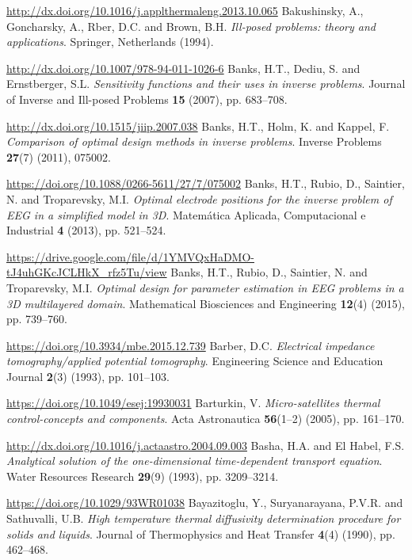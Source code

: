 \begin{thebibliography}{301}
\url{http://dx.doi.org/10.1016/j.applthermaleng.2013.10.065}
%
%
 Bakushinsky, A., Goncharsky, A., Rber, D.C. and Brown, B.H. {\it Ill-posed problems: theory and applications}. Springer, Netherlands (1994).

\url{http://dx.doi.org/10.1007/978-94-011-1026-6}
%
%
 Banks, H.T., Dediu, S. and Ernstberger, S.L. {\it Sensitivity functions and their uses in inverse problems}. Journal of Inverse and Ill-posed Problems {\bf 15} (2007), pp. 683--708. 

\url{http://dx.doi.org/10.1515/jiip.2007.038}
%
%
 Banks, H.T., Holm, K. and Kappel, F. {\it Comparison of optimal design methods in inverse problems}. Inverse Problems {\bf 27}(7) (2011), 075002.

\url{https://doi.org/10.1088/0266-5611/27/7/075002}
%
%
 Banks, H.T., Rubio, D., Saintier, N. and Troparevsky, M.I. {\it Optimal electrode positions for the inverse problem of EEG in a simplified model in 3D}. Matem\'atica Aplicada, Computacional e Industrial {\bf 4} (2013), pp. 521--524.

\url{https://drive.google.com/file/d/1YMVQxHaDMO-tJ4uhGKcJCLHkX_rfz5Tu/view}
%
%
 Banks, H.T., Rubio, D., Saintier, N. and Troparevsky, M.I. {\it Optimal design for parameter estimation in EEG problems in a 3D multilayered domain}. Mathematical Biosciences and Engineering {\bf 12}(4) (2015), pp. 739--760.

\url{https://doi.org/10.3934/mbe.2015.12.739}
%
%
 Barber, D.C. {\it Electrical impedance tomography/applied potential tomography}. Engineering Science and Education Journal {\bf 2}(3) (1993), pp. 101--103.

\url{https://doi.org/10.1049/esej:19930031}
%
%
 Barturkin, V. {\it Micro-satellites thermal control-concepts and components}. Acta Astronautica {\bf 56}(1--2) (2005), pp. 161--170.

\url{http://dx.doi.org/10.1016/j.actaastro.2004.09.003}
%
%
 Basha, H.A. and El Habel, F.S. {\it Analytical solution of the one-dimensional time-dependent transport equation}. Water Resources Research {\bf 29}(9) (1993), pp. 3209--3214.

\url{https://doi.org/10.1029/93WR01038}
%
%
 Bayazitoglu, Y., Suryanarayana, P.V.R. and Sathuvalli, U.B. {\it High temperature thermal
diffusivity determination procedure for solids and liquids}. Journal of Thermophysics and Heat Transfer {\bf 4}(4) (1990), pp. 462--468.


\end{thebibliography}

